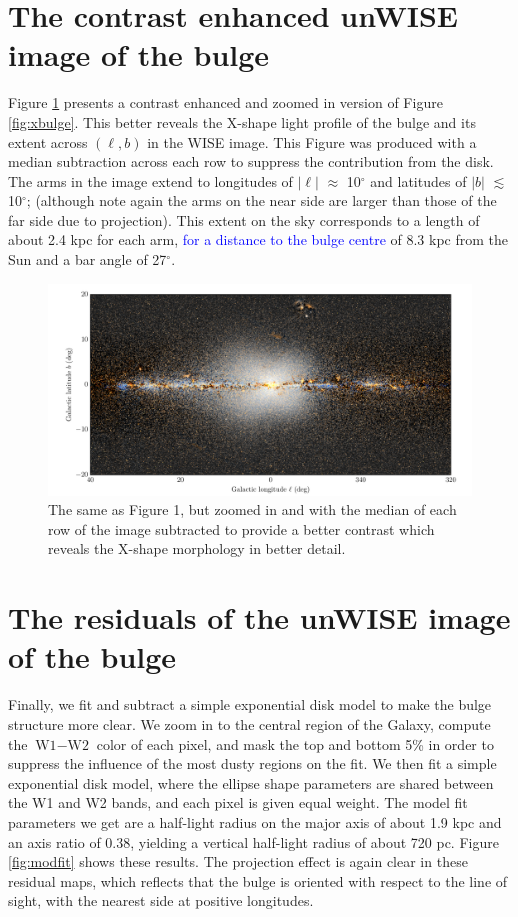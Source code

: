 \documentclass[12pt, preprint]{aastex}
\begin{document}
\section{The contrast enhanced unWISE image of the bulge}

Figure \ref{fig:filt} presents a contrast enhanced and zoomed in version of Figure \ref{fig:xbulge}. This better reveals the X-shape light profile of the bulge and its extent across $(\ell,b)$ in the WISE image. This Figure was produced with a median subtraction across each row to suppress the contribution from the disk. The arms in the image extend to longitudes of $|\ell|$ $\approx$ 10$^\circ$ and latitudes of $|b|$ $\lesssim$ 10$^\circ$; (although note again the arms on the near side are larger than those of the far side due to projection). This extent on the sky corresponds to a length of about 2.4 kpc for each arm, \textcolor{blue}{for a distance to the bulge centre} of 8.3 kpc from the Sun and a bar angle of 27$^\circ$.

\begin{figure}[h!]
\centering
        \includegraphics[width=\textwidth]{xbulge-01}
\caption{The same as Figure 1, but zoomed in and with the median of each row of the image subtracted to provide a better contrast which reveals the X-shape morphology in better detail.}
\label{fig:filt}
\end{figure}

\section{The residuals of the unWISE image of the bulge}

Finally, we fit and subtract a simple exponential disk model to make the bulge structure more clear.  We zoom in to the central region of the Galaxy, compute the $\textrm{W1} - \textrm{W2}$ color of each pixel, and mask the top and bottom 5\% in order to suppress the influence of the most dusty regions on the fit.  We then fit a simple exponential disk model, where the ellipse shape parameters are shared between the W1 and W2 bands, and each pixel is given equal weight.
The model fit parameters we get are a half-light radius on the major axis of about 1.9 kpc and an axis ratio of 0.38, yielding a vertical half-light radius of about 720 pc.
Figure \ref{fig:modfit} shows these results.
The projection effect is again clear in these residual maps, which reflects that the bulge is oriented with respect to the line of sight, with the nearest side at  positive longitudes. %
\end{document}
